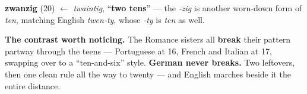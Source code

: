\begin{morphologybox}
\textbf{zwanzig} (20) $\leftarrow$ \emph{twaintig}, ``\textbf{two tens}'' ---
the \emph{-zig} is another worn-down form of \emph{ten}, matching English
\emph{twen-ty}, whose \emph{-ty} is \emph{ten} as well.
\end{morphologybox}

\begin{culture}
\textbf{The contrast worth noticing.} The Romance sisters all \textbf{break}
their pattern partway through the teens --- Portuguese at 16, French and
Italian at 17, swapping over to a ``ten-and-six'' style.
\textbf{German never breaks.} Two leftovers, then one clean rule all the way to
twenty --- and English marches beside it the entire distance.
\end{culture}
